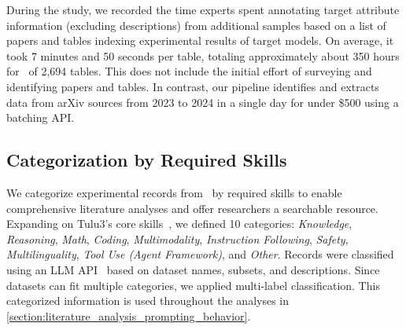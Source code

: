 During the study, we recorded the time experts spent annotating target attribute information (excluding descriptions) from additional samples based on a list of papers and tables indexing experimental results of target models. 
On average, it took 7 minutes and 50 seconds per table, totaling approximately about 350 hours for \datasetname~of 2,694 tables. 
This does not include the initial effort of surveying and identifying papers and tables. 
In contrast, our pipeline identifies and extracts data from arXiv sources from 2023 to 2024 in a single day for under \$500 using a batching API.


\begin{table}[t!]
\centering
{}
\caption{Results of Human Evaluation.}
\label{tab:dataset_human}
\end{table}


\subsection{Categorization by Required Skills}
\label{subsection:core_skills}

We categorize experimental records from \datasetname~by required skills to enable comprehensive literature analyses and offer researchers a searchable resource. 
Expanding on Tulu3's core skills~\citep{lambert2024t}, we defined 10 categories: \textit{Knowledge}, \textit{Reasoning}, \textit{Math}, \textit{Coding}, \textit{Multimodality}, \textit{Instruction Following}, \textit{Safety}, \textit{Multilinguality}, \textit{Tool Use (Agent Framework)}, and \textit{Other}.
Records were classified using an LLM API~\citep{hurst2024gpt} based on dataset names, subsets, and descriptions. 
Since datasets can fit multiple categories, we applied multi-label classification. 
This categorized information is used throughout the analyses in \cref{section:literature_analysis_prompting_behavior}.

